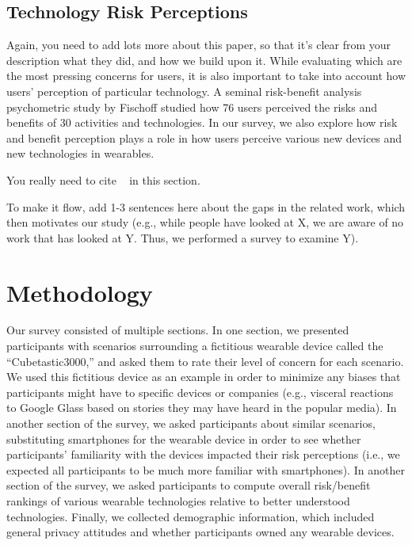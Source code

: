 \documentclass{acm_proc_article-sp}
\begin{document}
\subsection{Technology Risk Perceptions}
{\color{red} Again, you need to add lots more about this paper, so that it's clear from your description what they did, and how we build upon it.}
While evaluating which are the most pressing concerns for users, it is also important to take into account how users' perception of particular technology. A seminal risk-benefit analysis psychometric study by Fischoff \cite{Fischhoff} studied how 76 users perceived the risks and benefits of 30 activities and technologies. In our survey, we also explore how risk and benefit perception plays a role in how users perceive various new devices and new technologies in wearables. 

{\color{red} You really need to cite ~\cite{Denning2014} in this section.}

{\color{red} To make it flow, add 1-3 sentences here about the gaps in the related work, which then motivates our study (e.g., while people have looked at X, we are aware of no work that has looked at Y. Thus, we performed a survey to examine Y).}


\section{Methodology}
Our survey consisted of multiple sections. In one section, we presented participants with scenarios surrounding a fictitious wearable device called the ``Cubetastic3000,'' and asked them to rate their level of concern for each scenario. We used this fictitious device as an example in order to minimize any biases that participants might have to specific devices or companies (e.g., visceral reactions to Google Glass based on stories they may have heard in the popular media). In another section of the survey, we asked participants about similar scenarios, substituting smartphones for the wearable device in order to see whether participants' familiarity with the devices impacted their risk perceptions (i.e., we expected all participants to be much more familiar with smartphones). In another section of the survey, we asked participants to compute overall risk/benefit rankings of various wearable technologies relative to better understood technologies. Finally, we collected demographic information, which included general privacy attitudes and whether participants owned any wearable devices. 
\end{document}
